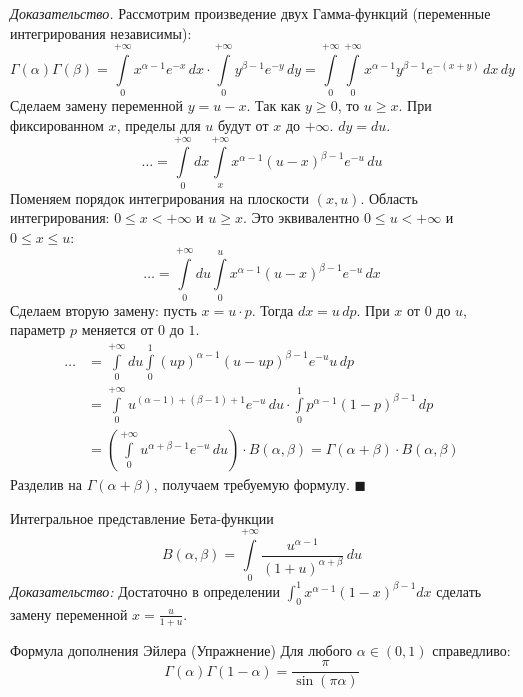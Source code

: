 \documentclass[12pt,a4paper]{article}
\newenvironment{Proof}[1][Доказательство]{\vspace{0.5em}\noindent\textit{#1.}\hspace{0.5em}\ignorespaces}{\hfill$\blacksquare$\vspace{1em}}
\begin{document}
\begin{Proof}
Рассмотрим произведение двух Гамма-функций (переменные интегрирования независимы):
$$ \Gamma(\alpha)\Gamma(\beta) = \int\limits_0^{+\infty} x^{\alpha-1} e^{-x} \, dx \cdot \int\limits_0^{+\infty} y^{\beta-1} e^{-y} \, dy = \int\limits_0^{+\infty} \int\limits_0^{+\infty} x^{\alpha-1} y^{\beta-1} e^{-(x+y)} \, dx \, dy $$
Сделаем замену переменной $y = u - x$. Так как $y \ge 0$, то $u \ge x$. При фиксированном $x$, пределы для $u$ будут от $x$ до $+\infty$. $dy = du$.
$$ \dots = \int\limits_0^{+\infty} dx \int\limits_x^{+\infty} x^{\alpha-1} (u-x)^{\beta-1} e^{-u} \, du $$
Поменяем порядок интегрирования на плоскости $(x, u)$. Область интегрирования: $0 \le x < +\infty$ и $u \ge x$. Это эквивалентно $0 \le u < +\infty$ и $0 \le x \le u$:
$$ \dots = \int\limits_0^{+\infty} du \int\limits_0^u x^{\alpha-1} (u-x)^{\beta-1} e^{-u} \, dx $$
Сделаем вторую замену: пусть $x = u \cdot p$. Тогда $dx = u \, dp$. При $x$ от $0$ до $u$, параметр $p$ меняется от $0$ до $1$.
\begin{align*}
    \dots &= \int\limits_0^{+\infty} du \int\limits_0^1 (up)^{\alpha-1} (u - up)^{\beta-1} e^{-u} u \, dp \\
    &= \int\limits_0^{+\infty} u^{(\alpha-1)+(\beta-1)+1} e^{-u} \, du \cdot \int\limits_0^1 p^{\alpha-1} (1-p)^{\beta-1} \, dp \\
    &= \left( \int\limits_0^{+\infty} u^{\alpha+\beta-1} e^{-u} \, du \right) \cdot B(\alpha, \beta) = \Gamma(\alpha+\beta) \cdot B(\alpha, \beta)
\end{align*}
Разделив на $\Gamma(\alpha+\beta)$, получаем требуемую формулу.
\end{Proof}

\begin{Lemma}{Интегральное представление Бета-функции}{}
$$ B(\alpha, \beta) = \int\limits_0^{+\infty} \frac{u^{\alpha-1}}{(1+u)^{\alpha+\beta}} \, du $$
\textit{Доказательство:} Достаточно в определении $\int_0^1 x^{\alpha-1}(1-x)^{\beta-1} dx$ сделать замену переменной $x = \frac{u}{1+u}$.
\end{Lemma}

\begin{Lemma}{Формула дополнения Эйлера (Упражнение)}{}
Для любого $\alpha \in (0, 1)$ справедливо:
$$ \Gamma(\alpha)\Gamma(1-\alpha) = \frac{\pi}{\sin(\pi \alpha)} $$
\end{Lemma}
\end{document}
